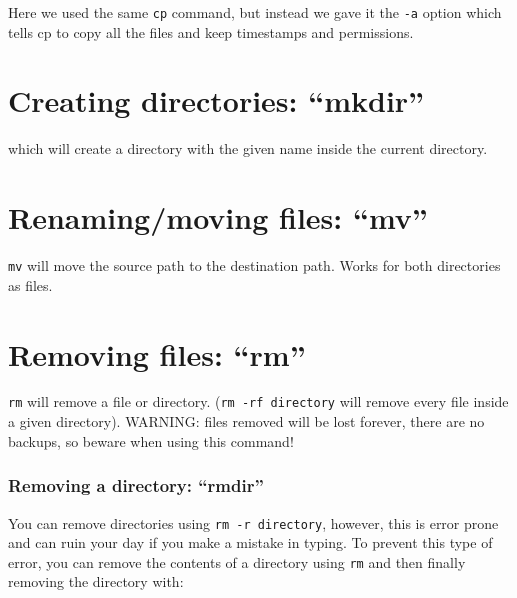 Here we used the same \lstinline|cp| command, but instead we gave it the \lstinline|-a| option
which tells cp to copy all the files and keep timestamps and permissions.

\section{Creating directories: ``mkdir''}

\begin{prompt}
\end{prompt}

which will create a directory with the given name inside the current directory.

\section{Renaming/moving files: ``mv''}

\begin{prompt}
\end{prompt}

\lstinline|mv| will move the source path to the destination path. Works for both directories as files.

\section{Removing files: ``rm''}


\begin{prompt}
\end{prompt}

\lstinline|rm| will remove a file or directory. (\lstinline|rm -rf directory| will remove every
file inside a given directory). WARNING: files removed will be lost forever,
there are no backups, so beware when using this command!

\subsubsection{Removing a directory: ``rmdir''}

You can remove directories using \lstinline|rm -r directory|, however, this is error
prone and can ruin your day if you make a mistake in typing. To prevent this
type of error, you can remove the contents of a directory using \lstinline|rm|
and then finally removing the directory with:

